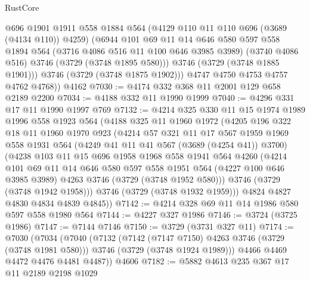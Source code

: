 \begin{lexlean}{RustCore}
\begin{coremodule}
            @696
            @1901
            @1911
            @558
            @1884
            @564
            (@4129 @110 @11 @110 @696 (@3689 (@4134 @110)) @4259)
            (@6944
              @101
              @69
              @11
              @14
              @646
              @580
              @597
              @558
              @1894
              @564
              (@3716 @4086 @516 @11 @100 @646 @3985 @3989)
              (@3740 @4086 @516)
              @3746
              (@3729 (@3748 @1895 @580)))
            @3746
            (@3729 (@3748 @1885 @1901)))
          @3746
          (@3729 (@3748 @1875 @1902)))
        @4747
        @4750
        @4753
        @4757
        @4762
        @4768))
    @4162
@7030 := @4174 @332 @368 @11 @2001 @129 @658 @2189 @2200
@7034 := @4188 @332 @11 @1990 @1999
@7040 := @4296 @331 @17 @11 @1990 @1997 @769
@7132 := @4214
    @325
    @330
    @11
    @15
    @1974
    @1989
    @1996
    @558
    @1923
    @564
    (@4188
      @325
      @11
      @1960
      @1972
      (@4205
        @196
        @322
        @18
        @11
        @1960
        @1970
        @923
        (@4214
          @57
          @321
          @11
          @17
          @567
          @1959
          @1969
          @558
          @1931
          @564
          (@4249 @41 @11 @41 @567 (@3689 (@4254 @41)) @3700)
          (@4238
            @103
            @11
            @15
            @696
            @1958
            @1968
            @558
            @1941
            @564
            @4260
            (@4214
              @101
              @69
              @11
              @14
              @646
              @580
              @597
              @558
              @1951
              @564
              (@4227 @100 @646 @3985 @3989)
              @4263
              @3746
              (@3729 (@3748 @1952 @580)))
            @3746
            (@3729 (@3748 @1942 @1958)))
          @3746
          (@3729 (@3748 @1932 @1959)))
        @4824
        @4827
        @4830
        @4834
        @4839
        @4845))
@7142 := @4214 @328 @69 @11 @14 @1986 @580 @597 @558 @1980 @564
@7144 := @4227 @327 @1986
@7146 := @3724 (@3725 @1986)
@7147 := @7144 @7146
@7150 := @3729 (@3731 @327 @11)
@7174 := @7030
    (@7034
      (@7040
        (@7132
          (@7142 (@7147 @7150) @4263 @3746 (@3729 (@3748 @1981 @580)))
          @3746
          (@3729 (@3748 @1924 @1989)))
        @4466
        @4469
        @4472
        @4476
        @4481
        @4487))
    @4606
@7182 := @5882 @4613 @235 @367 @17 @11 @2189 @2198 @1029

\end{coremodule}
\end{lexlean}

